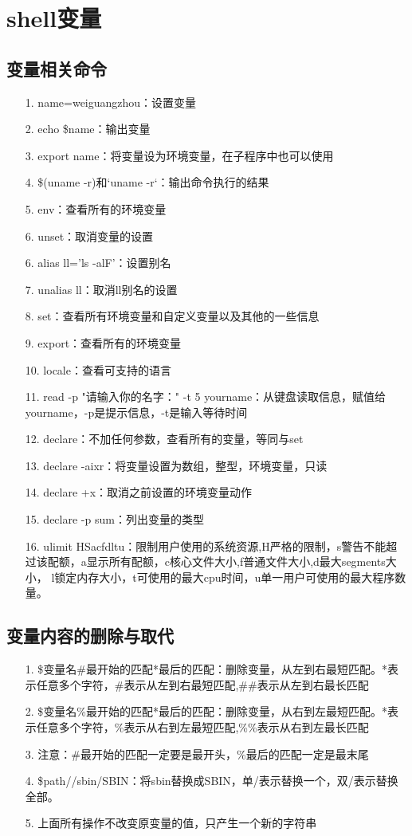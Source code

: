 \documentclass[a4paper,left=1.5cm,right=1.5cm,11pt]{article}
\begin{document}
\tableofcontents

\clearpage

\section{shell变量}
\subsection{变量相关命令}
\begin{itemize}
    \item[1.]name=weiguangzhou：设置变量
	\item[2.]echo \${name}：输出变量
	\item[3.]export name：将变量设为环境变量，在子程序中也可以使用
	\item[4.]\$(uname -r)和`uname -r`：输出命令执行的结果
	\item[5.]env：查看所有的环境变量
	\item[6.]unset：取消变量的设置
	\item[6.]alias ll='ls -alF'：设置别名
	\item[7.]unalias ll：取消ll别名的设置
	\item[8.]set：查看所有环境变量和自定义变量以及其他的一些信息
	\item[9.]export：查看所有的环境变量
	\item[10.]locale：查看可支持的语言
	\item[11.]read -p "请输入你的名字：" -t 5 yourname：从键盘读取信息，赋值给yourname，-p是提示信息，-t是输入等待时间
	\item[12.]declare：不加任何参数，查看所有的变量，等同与set
	\item[13.]declare -aixr：将变量设置为数组，整型，环境变量，只读
	\item[14.]declare +x：取消之前设置的环境变量动作
	\item[15.]declare -p sum：列出变量的类型
	\item[16.]ulimit HSacfdltu：限制用户使用的系统资源,H严格的限制，s警告不能超过该配额，a显示所有配额，c核心文件大小,f普通文件大小,d最大segments大小，
	l锁定内存大小，t可使用的最大cpu时间，u单一用户可使用的最大程序数量。
\end{itemize}
\subsection{变量内容的删除与取代}
\begin{itemize}
	\item[1.]\${变量名#最开始的匹配*最后的匹配}：删除变量，从左到右最短匹配。*表示任意多个字符，#表示从左到右最短匹配,##表示从左到右最长匹配
	\item[2.]\${变量名\%最开始的匹配*最后的匹配}：删除变量，从右到左最短匹配。*表示任意多个字符，\%表示从右到左最短匹配,\%\%表示从右到左最长匹配
	\item[3.]注意：#最开始的匹配一定要是最开头，\%最后的匹配一定是最末尾
	\item[4.]\${path//sbin/SBIN}：将sbin替换成SBIN，单/表示替换一个，双/表示替换全部。
	\item[5.]上面所有操作不改变原变量的值，只产生一个新的字符串
\end{itemize}
\end{document}

